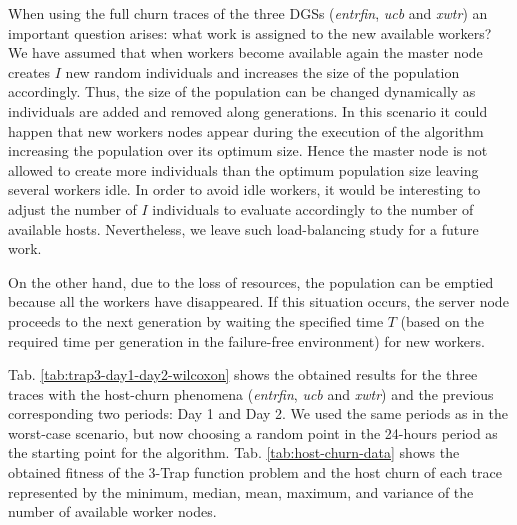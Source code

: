 \documentclass[graybox]{sty/svmult}
\begin{document}
When using the full churn traces of the three DGSs (\emph{entrfin}, \emph{ucb} and \emph{xwtr}) an important question arises: what work is
assigned to the new available workers? We have assumed that when workers become available again the master node creates
$I$ new random individuals and increases the size of the population accordingly. Thus, the size of the population can be
changed dynamically as individuals are added and removed along generations. In this scenario it could happen that new workers
nodes appear during the execution of the algorithm increasing the population over its optimum size. Hence
the master node is not allowed to create more individuals than the optimum population size leaving several workers
idle. In order to avoid idle workers, it would be interesting to adjust the number of $I$ individuals to evaluate accordingly
to the number of available hosts. Nevertheless, we leave such load-balancing study for a
future work. 

On the other hand, due to the loss of resources, the population can be emptied because all the workers have disappeared. If 
this situation occurs, the server node proceeds to the next generation by waiting the specified time $T$ (based on the required 
time per generation in the failure-free environment) for new workers.

Tab. \ref{tab:trap3-day1-day2-wilcoxon} shows the obtained results for the three traces with the host-churn phenomena
(\emph{entrfin}, \emph{ucb} and \emph{xwtr}) and the previous corresponding two periods: Day 1 and Day 2. We used the same periods as in the
worst-case scenario, but now choosing a random point in the 24-hours period as the starting point for the algorithm. Tab.
\ref{tab:host-churn-data} shows the obtained fitness of the 3-Trap function problem and the host churn of each trace represented by the
minimum, median, mean, maximum, and variance of the number of available worker nodes.
\end{document}
